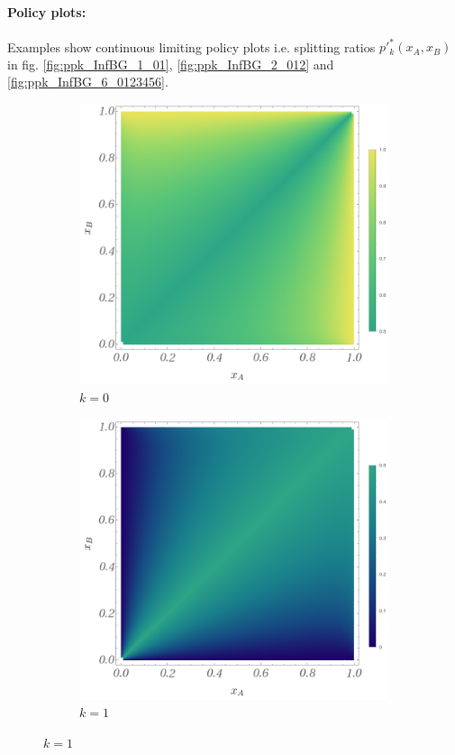 \documentclass{article}
\theoremstyle{definition}
\begin{document}
\paragraph{Policy plots:} Examples show continuous limiting policy plots i.e. splitting ratios $p'^*_k(x_A,x_B)$ in fig. \ref{fig:ppk_InfBG_1_01}, \ref{fig:ppk_InfBG_2_012} and \ref{fig:ppk_InfBG_6_0123456}.

\begin{figure}[H]
    \centering
    \begin{subfigure}[b]{0.4\textwidth}
        \includegraphics[width=\textwidth]{img/BinomialBayesian_ppk_1_0.png}
        \caption{$k=0$}
        \label{fig:ppkBG_1_0}
    \end{subfigure}
    \hspace{0.05\textwidth} %
    \begin{subfigure}[b]{0.4\textwidth}
        \includegraphics[width=\textwidth]{img/BinomialBayesian_ppk_1_1.png}
        \caption{$k=1$}
        \label{fig:ppkBG_1_1}
    \end{subfigure}
    

\end{figure}
\end{document}
